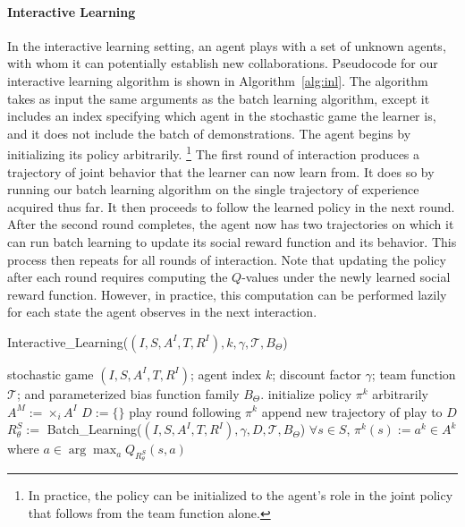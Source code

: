 
\paragraph{Interactive Learning}
\label{sec:interactive}

In the interactive learning setting, an agent plays with a set of
unknown agents, with whom it can potentially establish new
collaborations.  Pseudocode for our interactive learning algorithm is
shown in Algorithm~\ref{alg:inl}. The algorithm takes as input the
same arguments as the batch learning algorithm, except it includes an
index specifying which agent in the stochastic game the learner is,
and it does not include the batch of demonstrations. The agent begins
by initializing its policy arbitrarily.%
\footnote{In practice, the policy can be initialized to the agent's role
in the joint policy that follows from the team function alone.}
%
The first round of interaction produces a trajectory of joint behavior
that the learner can now learn from.  It does so by running our batch
learning algorithm on the single trajectory of experience acquired
thus far.  It then proceeds to follow the learned policy in the next
round.  After the second round completes, the agent now has two
trajectories on which it can run batch learning to update its social
reward function and its behavior.  This process then repeats for all
rounds of interaction.  
%
Note that updating the policy after each round requires computing the
$Q$-values under the newly learned social reward function.  However,
in practice, this computation can be performed lazily for each state
the agent observes in the next interaction.

\begin{algorithm}[t]
\caption{Interactive\_Learning($(I,S,A^I,T,R^I), k, \gamma, {\mathcal T}, B_\Theta$)}
\label{alg:inl}
\begin{algorithmic}
\Require stochastic game $(I,S,A^I,T,R^I)$; agent index $k$; discount factor $\gamma$; team function ${\mathcal T}$; and parameterized bias function family $B_\Theta$.
\State initialize policy $\pi^k$ arbitrarily
\State $A^M := \times_i A^I$ 
\State $D := \{\}$
\State play round following $\pi^k$ %
\State append new trajectory of play to $D$
\State $R^S_\theta :=$ Batch\_Learning($(I,S,A^I,T,R^I), \gamma, D, {\mathcal T}, B_\Theta$)
\State $\forall s \in S$, $\pi^k(s) := a^k \in A^k$ where $a \in \arg \max_a Q_{R^S_\theta}(s, a)$
\EndFor 
\end{algorithmic}
\end{algorithm}
